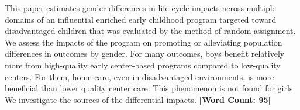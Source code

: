 \noindent This paper estimates gender differences in life-cycle impacts across multiple domains of an influential enriched early childhood program targeted toward disadvantaged children that was evaluated by the method of random assignment. We assess the impacts of the program on promoting or alleviating population differences in outcomes by gender. For many outcomes, boys benefit relatively more from high-quality early center-based programs compared to low-quality centers. For them, home care, even in disadvantaged environments, is more beneficial than lower quality center care. This phenomenon is not found for girls. We investigate the sources of the differential impacts. \textbf{[Word Count: 95]} 